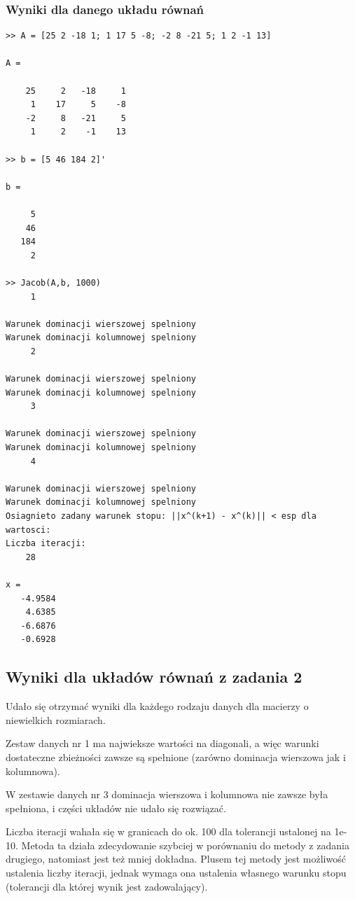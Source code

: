 \documentclass[11pt]{article} %
\begin{document}
\subsubsection{Wyniki dla danego układu równań}
\begin{verbatim}
>> A = [25 2 -18 1; 1 17 5 -8; -2 8 -21 5; 1 2 -1 13]

A =

    25     2   -18     1
     1    17     5    -8
    -2     8   -21     5
     1     2    -1    13

>> b = [5 46 184 2]'

b =

     5
    46
   184
     2
 
>> Jacob(A,b, 1000)
     1

Warunek dominacji wierszowej spelniony
Warunek dominacji kolumnowej spelniony
     2

Warunek dominacji wierszowej spelniony
Warunek dominacji kolumnowej spelniony
     3

Warunek dominacji wierszowej spelniony
Warunek dominacji kolumnowej spelniony
     4

Warunek dominacji wierszowej spelniony
Warunek dominacji kolumnowej spelniony
Osiagnieto zadany warunek stopu: ||x^(k+1) - x^(k)|| < esp dla wartosci:
Liczba iteracji:
    28

x = 
   -4.9584
    4.6385
   -6.6876
   -0.6928

\end{verbatim}

\subsection{Wyniki dla układów równań z zadania 2}
Udało się otrzymać wyniki dla każdego rodzaju danych dla macierzy o niewielkich rozmiarach.

Zestaw danych nr 1 ma najwieksze wartości na diagonali, a więc warunki dostateczne zbieżności zawsze są spełnione (zarówno dominacja wierszowa jak i kolumnowa).

W zestawie danych nr 3 dominacja wierszowa i kolumnowa nie zawsze była spełniona, i części układów nie udało się rozwiązać.

Liczba iteracji wahała się w granicach do ok. 100 dla tolerancji ustalonej na 1e-10.
Metoda ta działa zdecydowanie szybciej w porównaniu do metody z zadania drugiego, natomiast jest też mniej dokładna. Plusem tej metody jest możliwość ustalenia liczby iteracji, jednak wymaga ona ustalenia własnego warunku stopu (tolerancji dla której wynik jest zadowalający).
\end{document}
